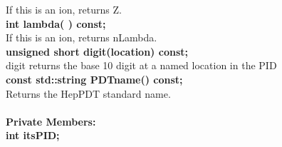 \begin{tabbing}
\hspace{1.0in}  If this is an ion, returns Z.\\
\hspace{0.5in}  {\bf int lambda( ) const; }\\
\hspace{1.0in}  If this is an ion, returns nLambda.\\
\hspace{0.5in}  {\bf unsigned short digit(location) const; }\\
\hspace{1.0in}  digit returns the base 10 digit at a named location in the PID \\
\hspace{0.5in}  {\bf const std::string PDTname() const; }\\
\hspace{1.0in}  Returns the HepPDT standard name. \\ \\

{\bf Private Members:} \\
\hspace{0.5in}  {\bf int itsPID; } \\

\end{tabbing}

\vfill\eject

